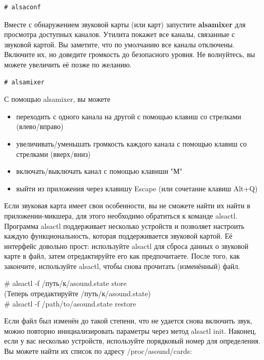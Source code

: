\documentclass[10pt]{book}
\begin{document}
\begin{tcolorbox}
\begin{lstlisting}
# alsaconf
\end{lstlisting}
\end{tcolorbox}

Вместе с обнаружением звуковой карты (или карт) запустите \textbf{alsamixer} для просмотра доступных каналов. Утилита покажет все каналы, связанные с звуковой картой. Вы заметите, что по умолчанию все каналы отключены. Включите их, но доведите громкость  до безопасного уровня. Не волнуйтесь, вы можете увеличить её позже по желанию.

\begin{tcolorbox}
\begin{lstlisting}
# alsamixer
\end{lstlisting}
\end{tcolorbox}

С помощью alsamixer, вы можете
\begin{itemize}
\item переходить с одного канала на другой с помощью клавиш со стрелками (влево/вправо)
\item увеличивать/уменьшать громкость каждого канала с помощью клавиш со стрелками (вверх/вниз)
\item включать/выключать канал с помощью клавиши "М"
\item выйти из приложения через клавишу Escape (или сочетание клавиш Alt+Q)
\end{itemize}

Если звуковая карта имеет свои особенности, вы не сможете найти их найти в приложении-микшера, для этого необходимо обратиться к команде alsactl. Программа alsactl поддерживает несколько устройств и позволяет настроить каждую функциональность, которая поддерживается звуковой картой. Её интерфейс довольно прост: используйте alsactl для сброса данных о звуковой карте в файл, затем отредактируйте его как предпочитаете. После того, как закончите, используйте alsactl, чтобы снова прочитать (изменённый) файл.

\begin{tcolorbox}
\# alsactl -f /путь/к/asound.state store \\
(Теперь отредактируйте /путь/к/asound.state) \\
\# alsactl -f /path/to/asound.state restore
\end{tcolorbox}

Если файл был изменён до такой степени, что не удается снова включить звук, можно повторно инициализировать параметры через метод alsactl init. Наконец, если у вас несколько устройств, используйте порядковый номер для определения. Вы можете найти их список по адресу  /proc/asound/cards:
\end{document}
